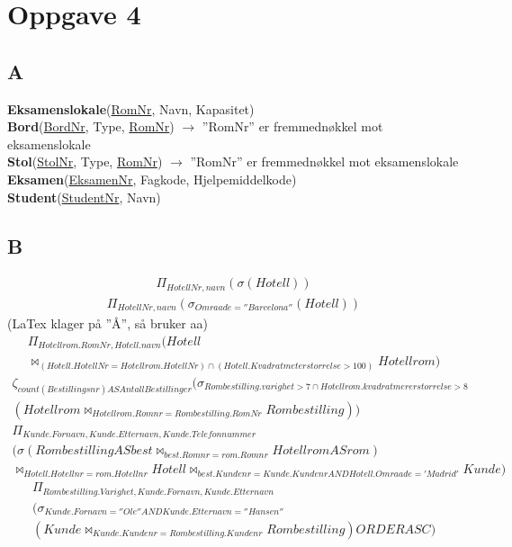 \documentclass[12pt,a4paper]{article}
\begin{document}
	\section{Oppgave 4}
	\subsection{A}
		\textbf{Eksamenslokale}(\underline{RomNr}, Navn, Kapasitet)\\
		\textbf{Bord}(\underline{BordNr}, Type, \underline{RomNr}) $\rightarrow$ ''RomNr'' er fremmednøkkel mot eksamenslokale\\
		\textbf{Stol}(\underline{StolNr}, Type, \underline{RomNr}) $\rightarrow$  ''RomNr'' er fremmednøkkel mot eksamenslokale\\
		\textbf{Eksamen}(\underline{EksamenNr}, Fagkode, Hjelpemiddelkode)\\
		\textbf{Student}(\underline{StudentNr}, Navn)
		
	\subsection{B}
			\begin{multline}
				\Pi_{HotellNr, navn}(\sigma(Hotell))
			\end{multline}
			\begin{multline}
				\Pi_{HotellNr, navn}(\sigma_{Omraade = ''Barcelona''}(Hotell))
			\end{multline}
			(LaTex klager på ''Å'', så bruker aa)		
			\begin{multline}
				\Pi_{Hotellrom.RomNr, Hotell.navn}(Hotell \\ 
				\Join_{(Hotell.HotellNr = Hotellrom.HotellNr) \cap (Hotell.Kvadratmeterstorrelse > 100)} Hotellrom)
			\end{multline}
			\begin{multline}
				\zeta_{count(Bestillingsnr) AS AntallBestillinger}(\sigma_{Rombestilling.varighet > 7 \cap Hotellrom.kvadratmererstorrelse > 8}\\
				(Hotellrom \Join_{Hotellrom.Romnr = Rombestilling.RomNr} Rombestilling))
			\end{multline}
			\begin{multline}
				\Pi_{Kunde.Fornavn, Kunde.Etternavn, Kunde.Telefonnummer} \\
				(\sigma(Rombestilling AS best \Join_{best.Romnr = rom.Romnr} Hotellrom AS rom) \\
				\Join_{Hotell.Hotellnr = rom.Hotellnr} Hotell \Join_{best.Kundenr = Kunde.Kundenr AND Hotell.Omraade = 'Madrid'} Kunde)
			\end{multline}
			\begin{multline}
				\Pi_{Rombestilling.Varighet, Kunde.Fornavn, Kunde.Etternavn}\\
				(\sigma_{Kunde.Fornavn = ''Ole'' AND Kunde.Etternavn = ''Hansen''}\\
				(Kunde \Join_{Kunde.Kundenr = Rombestilling.Kundenr} Rombestilling) ORDER ASC)
			\end{multline}
\end{document}
